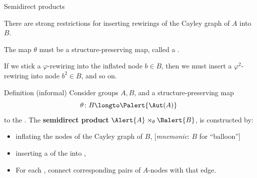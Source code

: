 \documentclass[8pt, handout]{beamer}
\newcommand{\Pause}{}
\begin{document}
\begin{frame}{Semidirect products} 
  
  There are strong restrictions for inserting rewirings of the
  Cayley graph of $A$ into $B$. \medskip\Pause
  
  The map $\theta$ must be a structure-preserving map, called a
  . \medskip\Pause
  
  If we stick a $\varphi$-rewiring into the inflated
  node $b\in B$, then we must insert a $\varphi^2$-rewiring into
  node $b^2\in B$, and so on. \medskip\Pause

  \begin{block}{Definition (informal)}\label{def2:semidirect}
    Consider groups $A,B$, and a structure-preserving map
    \[
    \theta\colon B\longto\Palert{\Aut(A)}
    \]
    to the . The \textbf{semidirect product}
    $\Alert{A}\rtimes_\theta \Balert{B}$, is constructed by: \smallskip\Pause
    \begin{itemize}
    \item inflating the nodes of the Cayley graph of $B$,
      [\emph{mnemonic}: $B$ for ``balloon''] \smallskip\Pause
    \item inserting a  of the
       into , \smallskip\Pause
    \item For each , connect corresponding
      pairs of $A$-nodes with that edge.
    \end{itemize}
  \end{block}
  
\end{frame}

\end{document}
